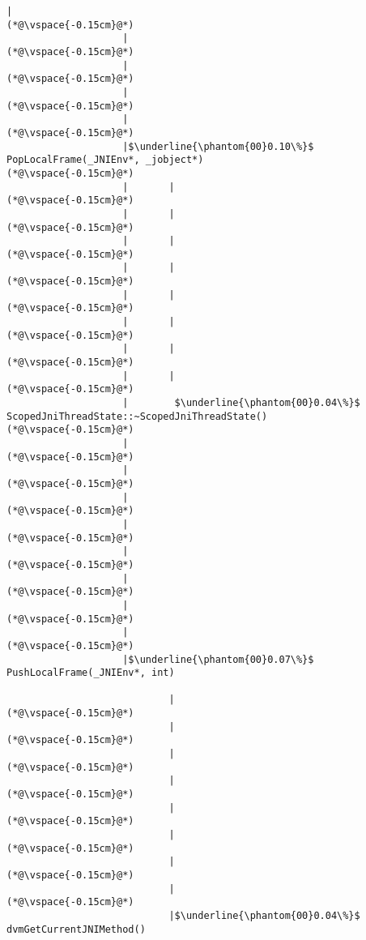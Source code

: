 \begin{lstlisting}[caption=Staattinen metodi C$\to$Java , label=profile:C2JBenchmark00001, numberbychapter=true, frame=lines, float, floatplacement=t]
                    |
(*@\vspace{-0.15cm}@*)
                    |
(*@\vspace{-0.15cm}@*)
                    |
(*@\vspace{-0.15cm}@*)
                    |
(*@\vspace{-0.15cm}@*)
                    |
(*@\vspace{-0.15cm}@*)
                    |$\underline{\phantom{00}0.10\%}$ PopLocalFrame(_JNIEnv*, _jobject*)
(*@\vspace{-0.15cm}@*)
                    |       |
(*@\vspace{-0.15cm}@*)
                    |       |
(*@\vspace{-0.15cm}@*)
                    |       |
(*@\vspace{-0.15cm}@*)
                    |       |
(*@\vspace{-0.15cm}@*)
                    |       |
(*@\vspace{-0.15cm}@*)
                    |       |
(*@\vspace{-0.15cm}@*)
                    |       |
(*@\vspace{-0.15cm}@*)
                    |       |
(*@\vspace{-0.15cm}@*)
                    |        $\underline{\phantom{00}0.04\%}$ ScopedJniThreadState::~ScopedJniThreadState()
(*@\vspace{-0.15cm}@*)
                    |
(*@\vspace{-0.15cm}@*)
                    |
(*@\vspace{-0.15cm}@*)
                    |
(*@\vspace{-0.15cm}@*)
                    |
(*@\vspace{-0.15cm}@*)
                    |
(*@\vspace{-0.15cm}@*)
                    |
(*@\vspace{-0.15cm}@*)
                    |
(*@\vspace{-0.15cm}@*)
                    |
(*@\vspace{-0.15cm}@*)
                    |$\underline{\phantom{00}0.07\%}$ PushLocalFrame(_JNIEnv*, int)

                            |
(*@\vspace{-0.15cm}@*)
                            |
(*@\vspace{-0.15cm}@*)
                            |
(*@\vspace{-0.15cm}@*)
                            |
(*@\vspace{-0.15cm}@*)
                            |
(*@\vspace{-0.15cm}@*)
                            |
(*@\vspace{-0.15cm}@*)
                            |
(*@\vspace{-0.15cm}@*)
                            |
(*@\vspace{-0.15cm}@*)
                            |$\underline{\phantom{00}0.04\%}$ dvmGetCurrentJNIMethod()


\end{lstlisting}
